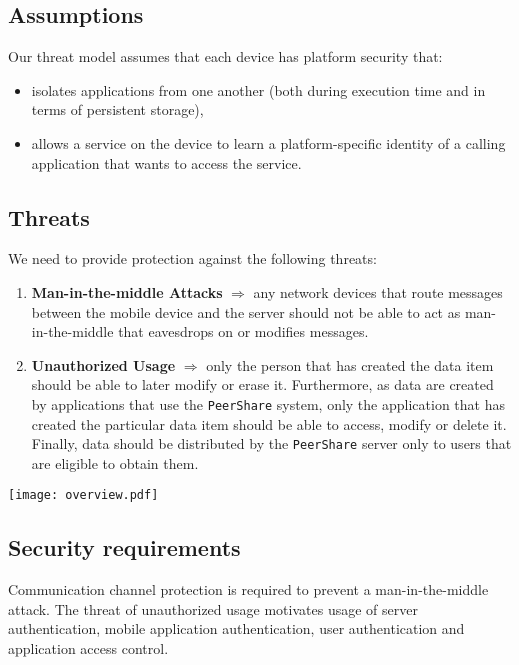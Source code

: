 \documentclass[twocolumn,a4paper,10pt]{article}
\newcommand{\peershare}{\texttt{PeerShare}\xspace}
\begin{document}
\subsection{Assumptions}
Our threat model assumes that each device has platform security that:
\begin{itemize}
\item isolates applications from one another (both during execution time and in terms of persistent storage),
\item allows a service on the device to learn a platform-specific identity of a calling application that wants to access the service.
\end{itemize}





\subsection{Threats}
We need to provide protection against the following threats: 
\begin{enumerate}
\item \textbf{Man-in-the-middle Attacks} $\Rightarrow$ any network devices that route messages between the mobile device and the server should not be able to act as man-in-the-middle that eavesdrops on or modifies messages. \item \textbf{Unauthorized Usage} $\Rightarrow$ only the person that has created the data item should be able to later modify or erase it. Furthermore, as data are created by applications that use the \peershare system, only the application that has created the particular data item should be able to access, modify or delete it. Finally, data should be distributed by the \peershare server only to users that are eligible to obtain them. \end{enumerate}

\begin{figure*}[!ht]
	\centering
	\texttt{[image: overview.pdf]}
    \caption{\peershare architecture.}
	\label{system_overview}
\end{figure*}

\subsection{Security requirements}
Communication channel protection is required to prevent a man-in-the-middle attack. The threat of unauthorized usage motivates usage of server authentication, mobile application authentication, user authentication and application access control.
\end{document}
